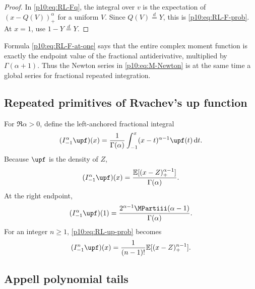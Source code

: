 \documentclass[11pt,oneside]{article}
\theoremstyle{definition}
\theoremstyle{remark}
\newcommand{\Q}{Q}
\newcommand{\E}{\mathbb E}
\newcommand{\dd}{\,\mathrm d}
\newcommand{\1}{\mathbf 1}
\begin{document}
\begin{proof}
In \cref{p10:eq:RL-Fq}, the integral over \(v\) is the expectation of
\((x-\Q(V))_+^\alpha\) for a uniform \(V\).  Since \(\Q(V)\overset d=Y\), this is
\cref{p10:eq:RL-F-prob}.  At \(x=1\), use \(1-Y\overset d=Y\).
\end{proof}

Formula \cref{p10:eq:RL-F-at-one} says that the entire complex moment function is exactly
the endpoint value of the fractional antiderivative, multiplied by
\(\Gamma(\alpha+1)\).  Thus the Newton series in \cref{p10:eq:M-Newton} is at the same
time a global series for fractional repeated integration.

\subsection{Repeated primitives of Rvachev's up function}

For \(\Re\alpha>0\), define the left-anchored fractional integral
\begin{equation}\label{p10:eq:RL-up-def}
 (I_{-1}^\alpha\upf)(x)
 =\frac1{\Gamma(\alpha)}\int_{-1}^x(x-t)^{\alpha-1}\upf(t)\dd t.
\end{equation}
Because \(\upf\) is the density of \(Z\),
\begin{equation}\label{p10:eq:RL-up-prob}
 (I_{-1}^\alpha\upf)(x)
 =\frac{\E[(x-Z)_+^{\alpha-1}]}{\Gamma(\alpha)}.
\end{equation}
At the right endpoint,
\begin{equation}\label{p10:eq:RL-up-at-one}
 (I_{-1}^\alpha\upf)(1)
 =\frac{2^{\alpha-1}\MPartiii(\alpha-1)}{\Gamma(\alpha)}.
\end{equation}
For an integer \(n\ge1\), \cref{p10:eq:RL-up-prob} becomes
\begin{equation}\label{p10:eq:nth-up-primitive}
 (I_{-1}^n\upf)(x)
 =\frac1{(n-1)!}\E[(x-Z)_+^{n-1}].
\end{equation}

\subsection{Appell polynomial tails}
\end{document}
